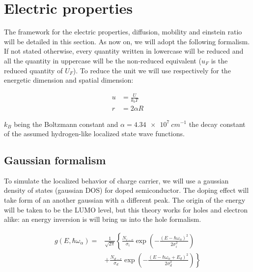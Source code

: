 
\chapter{Electric properties}
\label{chap:elec}

The framework for the electric properties, diffusion, mobility and einstein ratio will be detailed in this section. As now on, we will adopt the following formalism. If not stated otherwise, every quantity written in lowercase will be reduced and all the quantity in uppercase will be the non-reduced equivalent ($u_F$ is the reduced quantity of $U_F$). To reduce the unit we will use respectively for the energetic dimension and spatial dimension:

\begin{equation}
    \begin{aligned}
        u &= \frac{U}{k_bT}\\
        r &= 2\alpha R
    \end{aligned}
\end{equation}

$k_B$ being the Boltzmann constant and $\alpha = \SI{4.34e7}{cm^{-1}}$ the decay constant of the assumed hydrogen-like localized state wave functions.

\section{Gaussian formalism}

To simulate the localized behavior of charge carrier, we will use a gaussian density of states (gaussian DOS) for doped semiconductor. The doping effect will take form of an another gaussian with a different peak. The origin of the energy will be taken to be the LUMO level, but this theory works for holes and electron alike: an energy inversion is will bring us into the hole formalism.

\begin{equation}
    \begin{aligned}
    g\left(E, \hbar \omega_{\alpha}\right)=& \frac{1}{\sqrt{2 \pi}}\left\{\frac{N_{i-e}}{\sigma_{i}} \exp \left(-\frac{\left(E-\hbar \omega_{\alpha}\right)^{2}}{2 \sigma_{i}^{2}}\right)\right.\\
    &\left.+\frac{N_{d-e}}{\sigma_{d}} \exp \left(-\frac{\left(E-\hbar \omega_{\alpha}+E_{d}\right)^{2}}{2 \sigma_{d}^{2}}\right)\right\}
    \end{aligned}
    \label{eq:DOS_e}
\end{equation}

